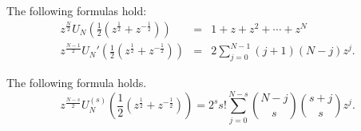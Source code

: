 \documentclass[10pt,a4paper]{amsart}
\newcommand{\pa}[1]{\left(#1\right)}
\begin{document}
\begin{lemma}\label{lem2}
The following formulas hold:
\begin{eqnarray*}
z^{\frac{N}{2}}U_N\pa{\frac{1}{2}\pa{z^{\frac{1}{2}} + z^{-\frac{1}{2}}}} &=& 1 + z + z^2 + \cdots + z^N \\
z^{\frac{N - 1}{2}}U_N'\pa{\frac{1}{2}\pa{z^{\frac{1}{2}} + z^{-\frac{1}{2}}}} &=& 2\sum_{j = 0}^{N - 1}(j + 1)(N - j)z^j.
\end{eqnarray*}
\end{lemma}

\begin{thm}\label{thm2} The following formula holds.
\begin{equation}\label{cheby-der-eqn3}
z^{\frac{N-s}{2}}U_N^{(s)}\pa{\frac{1}{2}\pa{z^{\frac{1}{2}} + z^{-\frac{1}{2}}}} = {2^s}{s!}\sum_{j = 0}^{N - s}{N-j\choose s}{s+j\choose s}z^j.
\end{equation}
\end{thm}
\end{document}
